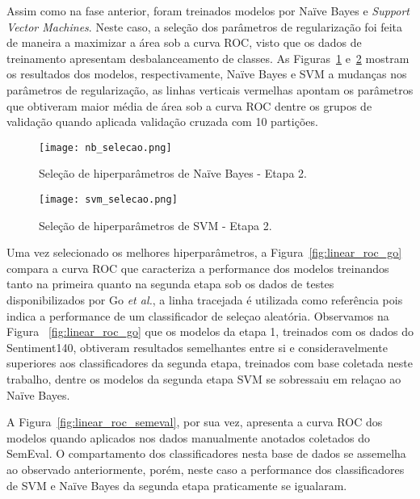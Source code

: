 Assim como na fase anterior, foram treinados modelos por Naïve Bayes e \textit{Support Vector Machines}.
Neste caso, a seleção dos parâmetros de regularização foi feita de maneira a maximizar a área sob a curva ROC, visto que
os dados de treinamento apresentam desbalanceamento de classes.
As Figuras~\ref{fig:nb_selecao} e~\ref{fig:svm_selecao} mostram os resultados dos modelos, respectivamente, Naïve Bayes e
SVM a mudanças nos parâmetros de regularização, as linhas verticais vermelhas apontam os parâmetros que obtiveram maior
média de área sob a curva ROC dentre os grupos de validação quando aplicada validação cruzada com 10 partições.

\begin{figure}
\begin{center} {
    \begin{center}
    \texttt{[image: nb\_selecao.png]}
    \caption{Seleção de hiperparâmetros de Naïve Bayes - Etapa 2.}
    \label{fig:nb_selecao}
    \end{center}
}
\end{center}
\end{figure}

\begin{figure}
\begin{center} {
    \begin{center}
    \texttt{[image: svm\_selecao.png]}
    \caption{Seleção de hiperparâmetros de SVM - Etapa 2.}
    \label{fig:svm_selecao}
    \end{center}
}
\end{center}
\end{figure}

Uma vez selecionado os melhores hiperparâmetros, a Figura~\ref{fig:linear_roc_go} compara a curva ROC que caracteriza a
performance dos modelos treinandos tanto na primeira quanto na segunda etapa sob os dados de testes disponibilizados
por Go \textit{et al.}, a linha tracejada é utilizada como referência pois indica a performance de um classificador de
seleçao aleatória.
Observamos na Figura ~\ref{fig:linear_roc_go} que os modelos da etapa 1, treinados com os dados do Sentiment140,
obtiveram resultados semelhantes entre si e consideravelmente superiores aos classificadores da segunda etapa, treinados
com base coletada neste trabalho, dentre os modelos da segunda etapa SVM se sobressaiu em relaçao ao Naïve Bayes.

A Figura~\ref{fig:linear_roc_semeval}, por sua vez, apresenta a curva ROC dos modelos quando aplicados nos dados
manualmente anotados coletados do SemEval.
O compartamento dos classificadores nesta base de dados se assemelha ao observado anteriormente, porém, neste caso a
performance dos classificadores de SVM e Naïve Bayes da segunda etapa praticamente se igualaram.

